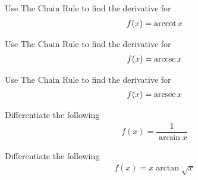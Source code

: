 \begin{exercise}
Use The Chain Rule to find the derivative for
\begin{align*}
    f(x) = \operatorname*{arccot} x
\end{align*}
\end{exercise}

\begin{exercise}
Use The Chain Rule to find the derivative for
\begin{align*}
    f(x) = \operatorname*{arccsc} x
\end{align*}
\end{exercise}

\begin{exercise}
Use The Chain Rule to find the derivative for
\begin{align*}
    f(x) = \operatorname*{arcsec} x
\end{align*}
\end{exercise}

\begin{exercise}
Differentiate the following
\begin{align*}
    f(x) = \dfrac{1}{\arcsin x}
\end{align*}
\end{exercise}

\begin{exercise}
Differentiate the following
\begin{align*}
    f(x) = x\arctan \sqrt{x}
\end{align*}
\end{exercise}